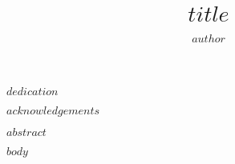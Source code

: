 \documentclass[letterpaper,oneside,11pt]{book}
\title{$title$}
\author{\textsc{$author$}}
\begin{document}
	\copyrightfalse

	\beforepreface

	\clearpage
	\thispagestyle{empty}
	\begin{dedication}
 		\begin{center}
 			\begin{minipage}[c]{3in}
 				\emph{%
 					$dedication$
 				}
 			\end{minipage}
 		\end{center}
	\end{dedication}

		$acknowledgements$

 		$abstract$

	\afterpreface

	$body$

\end{document}
